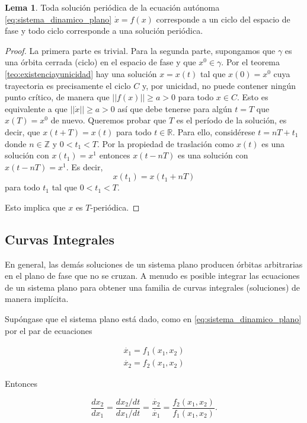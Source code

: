 \documentclass[11pt]{book}
\theoremstyle{definition}
\numberwithin{definition}{section}
\theoremstyle{theorem}
\newtheorem{lemma}{Lema}
\numberwithin{theorem}{section}
\numberwithin{lemma}{section}
\numberwithin{corollary}{section}
\theoremstyle{plain}
\numberwithin{example}{section}
\newcommand{\Z}{{\ensuremath{\mathbb{Z}}}}
\newcommand{\R}{{\ensuremath{\mathbb{R}}}}
\begin{document}
\begin{lemma}
Toda solución periódica de la ecuación autónoma \ref{eq:sistema_dinamico_plano} $\dot{x} = f(x)$ corresponde a un ciclo del espacio de fase y todo ciclo corresponde a una solución periódica.
\end{lemma}
\begin{proof}
La primera parte es trivial. Para la segunda parte, supongamos que $\gamma$ es una órbita cerrada (ciclo) en el espacio de fase y que $x^0 \in \gamma$.
Por el teorema \ref{teo:existenciayunicidad} hay una solución $x = x(t)$ tal que $x(0) = x^0$ cuya trayectoria es precisamente el ciclo $C$ y, por unicidad, no puede contener ningún punto crítico, de manera que $|| f(x) || \geq a > 0$ para todo $x \in C$.
Esto es equivalente a que $|| \dot{x} || \geq a > 0$ así que debe tenerse para algún $t = T$ que $x(T) = x^0$ de nuevo. Queremos probar que $T$ es el período de la solución, es decir, que $x(t+T) = x(t)$ para todo $t \in \R$. Para ello, considérese $t = nT + t_1$ donde $n \in \Z$ y $0 < t_1 < T$. Por la propiedad de traslación como $x(t)$ es una solución con $x(t_1) = x^1$ entonces $x(t - nT)$ es una solución con $x(t - nT) = x^1$. Es decir, $$ x(t_1) = x(t_1 + nT)$$ para todo $t_1$ tal que $0 < t_1 < T$.

Esto implica que $x$ es $T$-periódica.
\end{proof}

\subsection{Curvas Integrales}

En general, las demás soluciones de un sistema plano producen órbitas arbitrarias en el plano de fase que no se cruzan.
A menudo es posible integrar las ecuaciones de un sistema plano para obtener una familia de curvas integrales (soluciones) de manera implícita.

Supóngase que el sistema plano está dado, como en \ref{eq:sistema_dinamico_plano} por el par de ecuaciones

$$
\begin{array}{l}
	\dot{x_1} = f_1(x_1,x_2) \\
	\dot{x_2} = f_2(x_1,x_2)
\end{array}
$$

Entonces

\begin{equation} \label{eq:ecprimerordencurvaintegral}
	\dfrac{dx_2}{dx_1} = \frac{dx_2/dt}{dx_1/dt} = \frac{\dot{x_2}}{\dot{x_1}} = \dfrac{f_2(x_1,x_2)}{f_1(x_1,x_2)}.
\end{equation}
\end{document}
